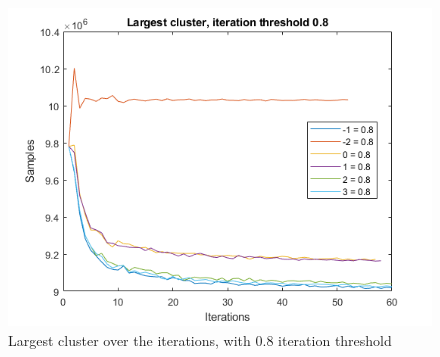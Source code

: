 \begin{figure}  %
  \centering
  \includegraphics[width=.7\textwidth]{figures/largest-0.8.png}
  \caption{Largest cluster over the iterations, with 0.8 iteration threshold}
  \label{fig:iter:largestcluster0.8}
\end{figure}

